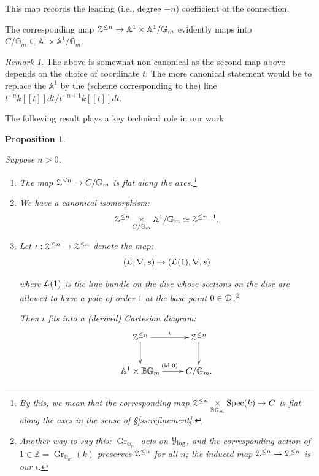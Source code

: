 \documentclass[reqno,11pt]{amsart}
\numberwithin{equation}{subsection}
\newtheorem{prop}[thm]{Proposition}
\theoremstyle{remark}
\newtheorem{rem}[thm]{Remark}
\newcommand{\bA}{{\mathbb A}}
\newcommand{\bB}{{\mathbb B}}
\newcommand{\bG}{{\mathbb G}}
\newcommand{\bZ}{{\mathbb Z}}
\newcommand{\sD}{{\EuScript D}}
\newcommand{\sL}{{\EuScript L}}
\newcommand{\sY}{{\EuScript Y}}
\newcommand{\sZ}{{\EuScript Z}}
\newcommand{\on}{\operatorname}
\newcommand{\Spec}{\on{Spec}}
\newcommand{\id}{\on{id}}
\newcommand{\Gr}{\on{Gr}}
\renewcommand{\subset}{\subseteq}
\begin{document}
\noindent This map records the leading (i.e.,
degree $-n$) coefficient of the connection. 

The corresponding map 
$\sZ^{\leq n} \to \bA^1 \times \bA^1/\bG_m$ evidently
maps into $C/\bG_m \subset \bA^1 \times \bA^1/\bG_m$.

\begin{rem}

The above is somewhat non-canonical as the second
map above depends
on the choice of coordinate $t$. 
The more canonical statement would be 
to replace the $\bA^1$ by the (scheme corresponding
to the) line $t^{-n} k[[t]]dt/t^{-n+1}k[[t]] dt$.

\end{rem}

The following result plays a key technical role in our work.

\begin{prop}\label{p:z-flat-axes}

Suppose $n>0$.

\begin{enumerate}

\item \label{i:z-axes-1}

The map $\sZ^{\leq n} \to C/\bG_m$ is flat
along the axes.\footnote{By this, we mean that the 
corresponding map $\sZ^{\leq n} \underset{\bB\bG_m}\times \Spec(k) \to C$ is flat along the axes in the
sense of \S \ref{ss:refinement}.}

\item \label{i:z-axes-2}

We have a canonical isomorphism:
%
\[
\sZ^{\leq n} \underset{C/\bG_m}{\times} \bA^1/\bG_m
\simeq \sZ^{\leq n-1}.
\]

\item \label{i:z-axes-3}

Let $\iota:\sZ^{\leq n} \to \sZ^{\leq n}$ 
denote the map:
%
\[
(\sL,\nabla,s) \mapsto (\sL(1),\nabla,s)
\]

\noindent 
where $\sL(1)$ is the line bundle on the disc 
whose sections on the disc are allowed
to have a pole of order $1$ at the base-point $0 \in \sD$.\footnote{Another way to say this: 
$\Gr_{\bG_m}$ acts on $\sY_{\log}$, and the corresponding
action of $1 \in \bZ = \Gr_{\bG_m}(k)$ preserves
$\sZ^{\leq n}$ for all $n$; the induced map
$\sZ^{\leq n} \to \sZ^{\leq n}$ is our $\iota$.}

Then $\iota$ fits into a (derived) Cartesian diagram:
%
\[
\xymatrix{
\sZ^{\leq n} \ar[r]^{\iota} \ar[d] & \sZ^{\leq n} \ar[d] \\
\bA^1 \times \bB \bG_m \ar[r]^{(\id,0)} & C/\bG_m.
}
\]

\end{enumerate}

\end{prop}
\end{document}
